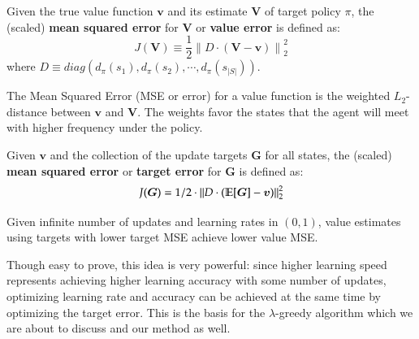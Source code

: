 \documentclass{article}
\begin{document}
\begin{definition}
Given the true value function $\bm{v}$ and its estimate $\bm{V}$ of target policy $\pi$, the (scaled) \textbf{mean squared error} for $\bm{V}$ or \textbf{value error} is defined as:
\begin{equation}
\nonumber
J(\bm{V}) \equiv \frac{1}{2}{\| D \cdot (\bm{V} - \bm{v}) \|}_2^2
\end{equation}
where $D \equiv diag(d_\pi(s_1), d_\pi(s_2), \cdots, d_\pi(s_{|S|}))$.
\end{definition}
\par
The Mean Squared Error (MSE or error) for a value function is the weighted $L_2$-distance between $\bm{v}$ and $\bm{V}$. The weights favor the states that the agent will meet with higher frequency under the policy.
\par
\begin{definition}
Given $\bm{v}$ and the collection of the update targets $\bm{G}$ for all states, the (scaled) \textbf{mean squared error} or \textbf{target error} for $\bm{G}$ is defined as:
\begin{equation}
\nonumber
J(\bm{G}) = 1/2 \cdot {\| D \cdot (\mathbb{E}[\bm{G}] - \bm{v}) \|}_2^2
\end{equation}
\end{definition}
\begin{proposition}
Given infinite number of updates and learning rates in $(0, 1)$, value estimates using targets with lower target MSE achieve lower value MSE.
\end{proposition}
\par
Though easy to prove, this idea is very powerful: since higher learning speed represents achieving higher learning accuracy with some number of updates, optimizing learning rate and accuracy can be achieved at the same time by optimizing the target error. This is the basis for the $\lambda$-greedy algorithm which we are about to discuss and our method as well.

\end{document}
